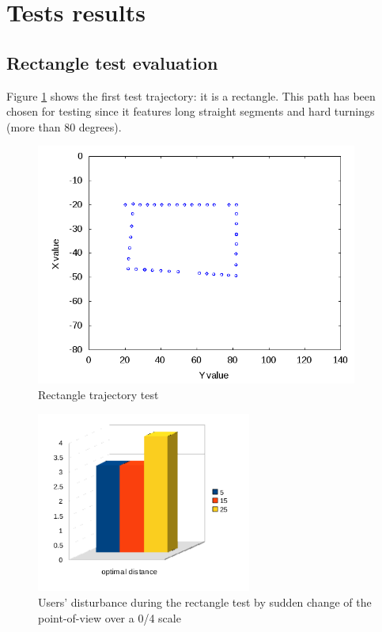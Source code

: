 \section{Tests results}
\label{performance_evaluation:tests_result}


\subsection{Rectangle test evaluation}
\label{performance_evaluation:tests_result:rectangletest}

Figure \ref{fig:rectangletest} shows the first test trajectory:
it is a rectangle. This path has been chosen for testing since it
features long straight segments and hard turnings (more than 80
degrees).

\begin{figure}[!h]
  \begin{center}
    \includegraphics[width=300pt]{img/path_session_9.png}
    \caption{Rectangle trajectory test} 
    \label{fig:rectangletest}
  \end{center}
\end{figure}

\begin{figure}[!h]
  \begin{center}
    \includegraphics[width=200pt]{img/square.png}
    \caption{Users' disturbance during the rectangle test 
      by sudden change of the point-of-view over a 0/4 scale}
  \end{center}
\end{figure}

